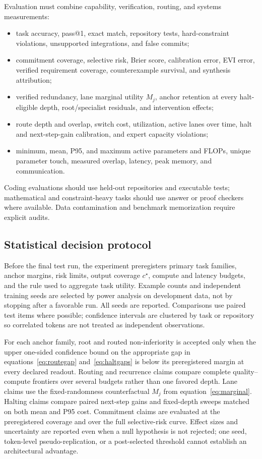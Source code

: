 \documentclass[10pt,a4paper]{article}
\begin{document}
Evaluation must combine capability, verification, routing, and systems
measurements:
\begin{itemize}
\item task accuracy, pass@1, exact match, repository tests, hard-constraint
  violations, unsupported integrations, and false commits;
\item commitment coverage, selective risk, Brier score, calibration error, EVI
  error, verified requirement coverage, counterexample survival, and synthesis
  attribution;
\item verified redundancy, lane marginal utility $M_j$, anchor retention at
  every halt-eligible depth, root/specialist residuals, and intervention
  effects;
\item route depth and overlap, switch cost, utilization, active lanes over
  time, halt and next-step-gain calibration, and expert capacity violations;
\item minimum, mean, P95, and maximum active parameters and FLOPs, unique
  parameter touch, measured overlap, latency, peak memory, and communication.
\end{itemize}
Coding evaluations should use held-out repositories and executable tests;
mathematical and constraint-heavy tasks should use answer or proof checkers
where available. Data contamination and benchmark memorization require
explicit audits.

\subsection{Statistical decision protocol}

Before the final test run, the experiment preregisters primary task families,
anchor margins, risk limits, output coverage $c^\star$, compute and latency
budgets, and the rule used to aggregate task utility. Example counts and
independent training seeds are selected by power analysis on development data,
not by stopping after a favorable run. All seeds are reported. Comparisons use
paired test items where possible; confidence intervals are clustered by task
or repository so correlated tokens are not treated as independent
observations.

For each anchor family, root and routed non-inferiority is accepted only when
the upper one-sided confidence bound on the appropriate gap in
equations~\eqref{eq:routegap} and~\eqref{eq:haltgaps} is below its
preregistered margin at every declared readout. Routing and recurrence claims
compare complete quality--compute frontiers over several budgets rather than
one favored depth. Lane claims use the fixed-randomness counterfactual $M_j$
from equation~\eqref{eq:marginal}. Halting claims compare paired next-step
gains and fixed-depth sweeps matched on both mean and P95 cost. Commitment
claims are evaluated at the preregistered coverage and over the full
selective-risk curve. Effect sizes and uncertainty are reported even when a
null hypothesis is not rejected; one seed, token-level pseudo-replication, or
a post-selected threshold cannot establish an architectural advantage.
\end{document}
